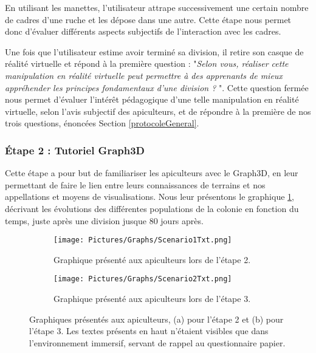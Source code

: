 		En utilisant les manettes, l'utilisateur attrape successivement une certain nombre de cadres d'une ruche et les dépose dans une autre. Cette étape nous permet donc d'évaluer différents aspects subjectifs de l'interaction avec les cadres.
		
		Une fois que l'utilisateur estime avoir terminé sa division, il retire son casque de réalité virtuelle et répond à la première question : "\textit{Selon vous, réaliser cette manipulation en réalité virtuelle peut permettre à des apprenants de mieux appréhender les principes fondamentaux d'une division ? }". Cette question fermée nous permet d'évaluer l'intérêt pédagogique d'une telle manipulation en réalité virtuelle, selon l'avis subjectif des apiculteurs, et de répondre à la première de nos trois questions, énoncées Section \ref{protocoleGeneral}.
		
		\subsubsection{Étape 2 : Tutoriel Graph3D}
		Cette étape a pour but de familiariser les apiculteurs avec le Graph3D, en leur permettant de faire le lien entre leurs connaissances de terrains et nos appellations et moyens de visualisations. Nous leur présentons le graphique \ref{sc1txt}, décrivant les évolutions des différentes populations de la colonie en fonction du temps, juste après une division jusque 80 jours après.
		
		
		\begin{figure}
			\centering
		
			\begin{subfigure}{\textwidth}
			\centering
			\texttt{[image: Pictures/Graphs/Scenario1Txt.png]}
			\caption{Graphique présenté aux apiculteurs lors de l'étape 2.}
			\label{sc1txt}	
			\end{subfigure}
			
			\begin{subfigure}{\textwidth}
			\centering
			\texttt{[image: Pictures/Graphs/Scenario2Txt.png]}
			\caption{Graphique présenté aux apiculteurs lors de l'étape 3.}
			\label{sc2txt}
			\end{subfigure}
			
		\caption[Graphiques présentés aux apiculteurs, (a) pour l'étape  2 et (b) pour l'étape 3]{Graphiques présentés aux apiculteurs, (a) pour l'étape  2 et (b) pour l'étape 3. Les textes présents en haut n'étaient visibles que dans l'environnement immersif, servant de rappel au questionnaire papier.}
		\label{scsTxt}
		\end{figure}
		

